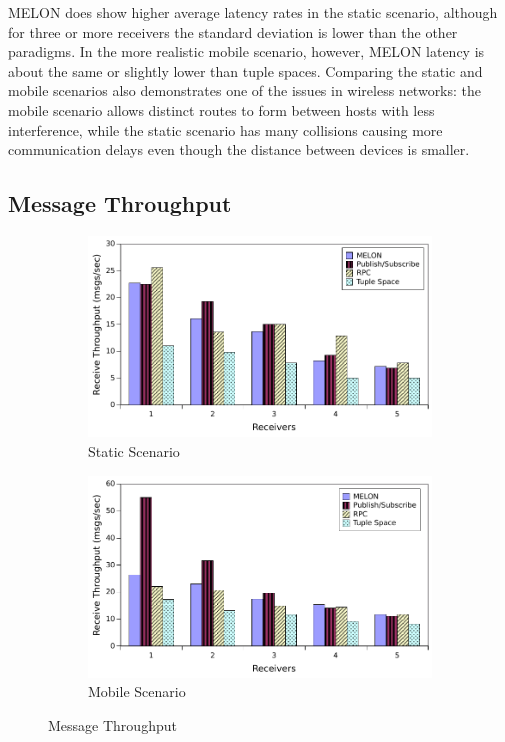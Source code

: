 MELON does show higher average latency rates in the static scenario, although for three or more receivers the standard deviation is lower than the other paradigms. In the more realistic mobile scenario, however, MELON latency is about the same or slightly lower than tuple spaces. Comparing the static and mobile scenarios also demonstrates one of the issues in wireless networks: the mobile scenario allows distinct routes to form between hosts with less interference, while the static scenario has many collisions causing more communication delays even though the distance between devices is smaller.

\subsection{Message Throughput}

\begin{figure}
\centering

\begin{subfigure}{.5\textwidth}
\centering
\includegraphics[width = \linewidth, clip, trim = 0px 0px 0px 0px]{figures/throughput_static.pdf}
\caption{Static Scenario}
\label{fig:throughputstatic}
\end{subfigure}%
\begin{subfigure}{.5\textwidth}
\centering
\includegraphics[width = \linewidth, clip, trim = 0px 0px 0px 0px]{figures/throughput_mobile.pdf}
\caption{Mobile Scenario}
\label{fig:throughputmobile}
\end{subfigure}
\caption{Message Throughput}
\end{figure}


